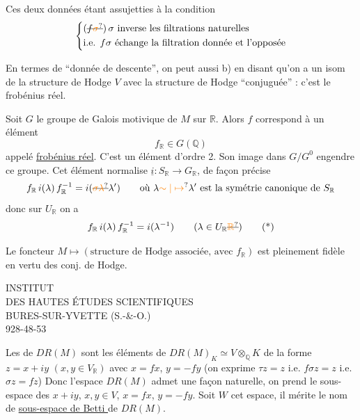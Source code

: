 Ces deux données étant assujetties à la condition
\[
\left\{\begin{aligned}
 &( \deleted{f\unsure{\sigma}} )\,\sigma\ \text{inverse les filtrations naturelles}\\
 &\text{i.e. } f\sigma\ \text{échange la filtration donnée et l'opposée}
\end{aligned}\right.
\]

En termes de ``donnée de descente'', on peut 
aussi b) en disant qu'on a un isom
de la structure de Hodge $V$ avec la structure de
Hodge  ``conjuguée'' : c'est le frobénius réel.

Soit $G$ le groupe de Galois motivique de $M$ sur $\mathbb R$.
Alors $f$ correspond à un élément
\[
f_{\mathbb R}\in G(\mathbb Q)
\]
appelé \uline{frobénius réel}. C'est un élément d'ordre 2.
Son image dans $G/G^0$ engendre ce groupe. Cet
élément normalise $\underline i:S_{\mathbb R}\longrightarrow G_{\mathbb R}$, de façon précise
\[
f_{\mathbb R}\,i(\lambda)\,f_{\mathbb R}^{-1}=i(\deleted{\unsure{\sigma\lambda}}\lambda')
\qquad\text{où }\lambda\unsure{\sim|\mapsto}\lambda'\ \text{est la symétrie canonique de }S_{\mathbb R}
\]
donc sur $U_{\mathbb R}$ on a
\[
 f_{\mathbb R}\,i(\lambda)\,f_{\mathbb R}^{-1}=i(\lambda^{-1})
 \qquad(\lambda\in U_{\mathbb R}\deleted{\unsure{\mathbb R}}) \tag*{(*)}
\]

Le foncteur $M\longmapsto(\text{structure de Hodge associée, avec }f_{\mathbb R})$
est pleinement fidèle en vertu des conj. de Hodge.

\begin{center}
INSTITUT\\
DES HAUTES ÉTUDES SCIENTIFIQUES\\
BURES-SUR-YVETTE (S.-\&-O.)\\
928-48-53
\end{center}

Les  de $DR(M)$ sont les éléments de
$DR(M)_K\simeq V\otimes_{\mathbb Q}K$ de la forme $z=x+iy$ $(x,y\in V_{\mathbb R})$
avec $x=fx$, $y=-fy$ (on exprime $\tau z=z$ i.e. $f\sigma z=z$ i.e. $\sigma z=fz$)
 Donc l'espace $DR(M)$ admet une  façon naturelle,
 on prend le sous-espace des
$x+iy$, $x,y\in V$, $x=fx$, $y=-fy$. Soit $W$ cet espace, il
mérite le nom de \uline{sous-espace de Betti } de $DR(M)$.

